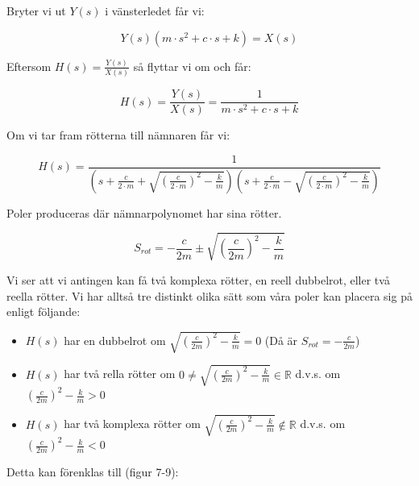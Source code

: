\documentclass[10pt,a4paper]{article}
\begin{document}
Bryter vi ut $Y(s)$ i vänsterledet får vi:

\begin{equation}
Y(s)(m \cdot s^2 + c \cdot s + k) = X(s)
\end{equation}

Eftersom $H(s) = \frac{Y(s)}{X(s)}$ så flyttar vi om och får:

\begin{equation}
H(s) = \frac{Y(s)}{X(s)} = \frac{1}{m\cdot s^2 + c \cdot s + k}
\end{equation}

Om vi tar fram rötterna till nämnaren får vi:

\begin{equation}
H(s)= \frac{1}{(s + \frac{c}{2 \cdot m} + \sqrt{ (\frac{c}{2 \cdot m})^2 - \frac{k}{m}}) (s + \frac{c}{2 \cdot m} - \sqrt{ (\frac{c}{2 \cdot m})^2 - \frac{k}{m}})}
\end{equation}

Poler produceras där nämnarpolynomet har sina rötter.

\begin{equation}
S_{rot}=-\frac{c}{2m} \pm \sqrt{(\frac{c}{2m})^2-\frac{k}{m}}
\end{equation}

Vi ser att vi antingen kan få två komplexa rötter, en reell dubbelrot, eller två reella rötter. Vi har alltså tre distinkt olika sätt som våra poler kan placera sig på enligt följande:
\begin{itemize}

\item $H(s)$ har en dubbelrot om $\sqrt{(\frac{c}{2m})^2-\frac{k}{m}}=0$ (Då är $S_{rot}=-\frac{c}{2m}$)


\item $H(s)$ har två rella rötter om $0\neq\sqrt{(\frac{c}{2m})^2-\frac{k}{m}}\in \mathbb{R}$ \newline d.v.s. om $(\frac{c}{2m})^2-\frac{k}{m}>0$


\item $H(s)$ har två komplexa rötter om $\sqrt{(\frac{c}{2m})^2-\frac{k}{m}}\notin \mathbb{R}$ \newline d.v.s. om $(\frac{c}{2m})^2-\frac{k}{m}<0$

\end{itemize}

Detta kan förenklas till (figur 7-9):
\end{document}
